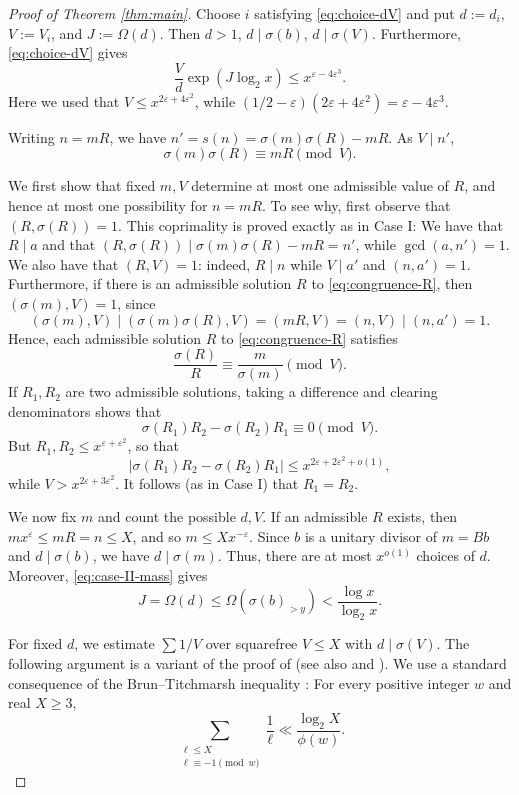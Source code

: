 \documentclass[11pt]{amsart}
\begin{document}
\begin{proof}[Proof of Theorem \ref{thm:main}]
Choose $i$ satisfying \eqref{eq:choice-dV} and put $d:=d_i$, $V:=V_i$, and $J:=\Omega(d)$.
Then $d>1$, $d\mid\sigma(b)$, $d\mid\sigma(V)$. Furthermore, \eqref{eq:choice-dV} gives
\begin{equation}\label{eq:dVstuff}
 \frac Vd \exp(J\log_2{x})\le x^{\varepsilon-4\varepsilon^3}.
\end{equation}
Here we used that $V \le x^{2\varepsilon + 4\varepsilon^2}$, while 
$(1/2-\varepsilon)(2\varepsilon+4\varepsilon^2)
=\varepsilon-4\varepsilon^3$.

Writing \(n=mR\), we have \(n'=s(n)=\sigma(m)\sigma(R)-mR\). As \(V\mid n'\),
\begin{equation}\label{eq:congruence-R}
 \sigma(m)\sigma(R)\equiv mR\pmod V.
\end{equation}

We first show that fixed $m,V$ determine at most one admissible
value of $R$, and hence at most one possibility for $n=mR$.
To see why, first observe that $(R,\sigma(R))=1$. This coprimality is proved exactly as in Case I: We have that $R\mid a$ and that $(R,\sigma(R)) \mid \sigma(m)\sigma(R)-mR = n'$, while $\gcd(a,n')=1$.
We also have that $(R,V)=1$: indeed, $R\mid n$
while $V\mid a'$ and $(n,a')=1$. Furthermore, if there is an
admissible solution $R$ to \eqref{eq:congruence-R}, then
$(\sigma(m),V)=1$, since
\[
 (\sigma(m),V)\mid(\sigma(m)\sigma(R),V)
 =(mR,V)=(n,V)\mid(n,a')=1.
\]
Hence, each admissible solution $R$ to \eqref{eq:congruence-R} satisfies
\[
 \frac{\sigma(R)}R\equiv\frac{m}{\sigma(m)}\pmod V.
\]
If $R_1,R_2$ are two admissible solutions, taking a difference and clearing denominators shows that
\[
 \sigma(R_1)R_2-\sigma(R_2)R_1\equiv0\pmod V.
\]
But $R_1, R_2 \le x^{\varepsilon+\varepsilon^2}$, so that
\[
 |\sigma(R_1)R_2-\sigma(R_2)R_1| \le x^{2\varepsilon+2\varepsilon^2+o(1)},
 \]
while $V>x^{2\varepsilon+3\varepsilon^2}$. It follows (as in Case I) that $R_1= R_2$.

We now fix $m$ and count the possible $d,V$. If an admissible
$R$ exists, then $mx^\varepsilon\le mR=n\le X$, and so
$m\le Xx^{-\varepsilon}$. Since $b$ is a unitary divisor of
$m=Bb$ and $d\mid\sigma(b)$, we have $d\mid\sigma(m)$.
Thus, there are at most $x^{o(1)}$ choices of $d$. Moreover,
\eqref{eq:case-II-mass} gives
\[
 J=\Omega(d)\le\Omega(\sigma(b)_{>y})
 < \frac{\log x}{\log_2 x}.
\]

For fixed $d$, we estimate $\sum 1/V$ over squarefree $V\le X$
with $d\mid\sigma(V)$. The following argument is a variant of the proof of
\cite[Lemma 2.4]{Pollack2011}
(see also \cite[Lemma 2.1]{LucaPollack2011}
and \cite[Lemma 7]{Pollack2019}). We use a standard consequence of the
Brun--Titchmarsh inequality \cite[Theorem 3.9, p.~90]{MontgomeryVaughan2007}: For every positive integer $w$ and real $X\ge3$,
\begin{equation}\label{eq:prime-reciprocals}
 \sum_{\substack{\ell\le X\\\ell\equiv-1\pmod w}}\frac1\ell
 \ll\frac{\log_2 X}{\phi(w)}.
\end{equation}


\end{proof}
\end{document}
